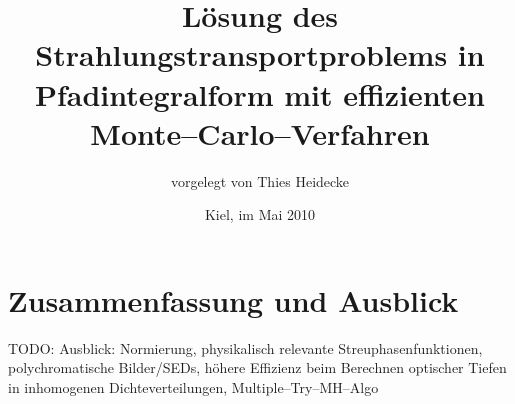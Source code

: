\documentclass[
	12pt,
	a4paper,
	pagesize=auto,
	DIV=10,
	parskip=half,
	titlepage,
	twoside,
	listof=totoc,
	bibliography=totocnumbered,
	final%
]{scrbook}
\begin{document}
\frontmatter
	\titlehead{Christian--Albrechts--Universität zu Kiel\\Institut für Theoretische Physik und Astrophysik}
	\subject{Diplomarbeit}
	\title{Lösung des Strahlungstransportproblems in Pfadintegralform mit effizienten Monte--Carlo--Verfahren}
	\author{vorgelegt von Thies Heidecke}%
	\date{Kiel, im Mai 2010}
	\publishers{betreut durch Prof. Dr. Sebastian Wolf}
	\maketitle

	\tableofcontents	%
	
\mainmatter
	
	
	
	
	
	
		
	
	\chapter{Zusammenfassung und Ausblick}
	TODO: Ausblick: Normierung, physikalisch relevante Streuphasenfunktionen, polychromatische Bilder/SEDs, höhere Effizienz beim Berechnen optischer Tiefen in inhomogenen Dichteverteilungen, Multiple--Try--MH--Algo

\backmatter
	\mdqoff
	
	
	\mdqon
\end{document}
